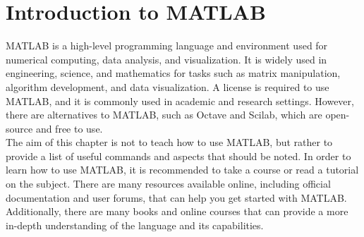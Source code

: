 \chapter{Introduction to MATLAB}

MATLAB is a high-level programming language and environment used for numerical computing, data analysis, and visualization. It is widely used in engineering, science, and mathematics for tasks such as matrix manipulation, algorithm development, and data visualization. A license is required to use MATLAB, and it is commonly used in academic and research settings. However, there are alternatives to MATLAB, such as Octave and Scilab, which are open-source and free to use.\\


The aim of this chapter is not to teach how to use MATLAB, but rather to provide a list of useful commands and aspects that should be noted. In order to learn how to use MATLAB, it is recommended to take a course or read a tutorial on the subject. There are many resources available online, including official documentation and user forums, that can help you get started with MATLAB. Additionally, there are many books and online courses that can provide a more in-depth understanding of the language and its capabilities.
